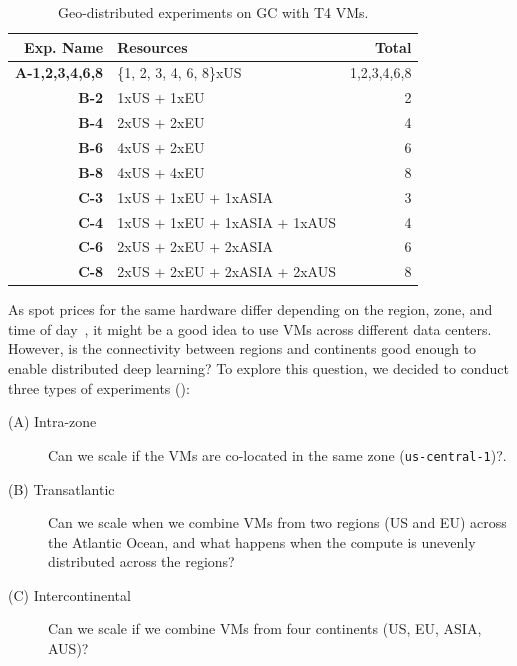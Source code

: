 \begin{table}[]
    \begin{tabular}{r|l|r}
    \textbf{Exp. Name} & \textbf{Resources} & \textbf{Total} \\ \hline
    \textbf{A-1,2,3,4,6,8} & \{1, 2, 3, 4, 6, 8\}xUS & 1,2,3,4,6,8\\ \hline
    \textbf{B-2} & 1xUS + 1xEU & 2\\
    \textbf{B-4} & 2xUS + 2xEU & 4\\
    \textbf{B-6} & 4xUS + 2xEU & 6\\
    \textbf{B-8} & 4xUS + 4xEU & 8 \\ \hline
    \textbf{C-3} & 1xUS + 1xEU + 1xASIA & 3\\
    \textbf{C-4} & 1xUS + 1xEU + 1xASIA + 1xAUS & 4\\
    \textbf{C-6} & 2xUS + 2xEU + 2xASIA & 6\\
    \textbf{C-8} & 2xUS + 2xEU + 2xASIA + 2xAUS & 8\\
    \end{tabular}
    \caption{Geo-distributed experiments on GC with T4 VMs.}
    \label{tab:geodistributed-experiments}
    \vspace*{-10mm}
\end{table} 

As spot prices for the same hardware differ depending on the region, zone, and time of day~\cite{lee2017deepspotcloud}, it might be a good idea to use VMs across different data centers.
However, is the connectivity between regions and continents good enough to enable distributed deep learning?
To explore this question, we decided to conduct three types of experiments ():
\begin{description}
    \item[(A) Intra-zone] Can we scale if the VMs are co-located in the same zone (\texttt{us-central-1})?.
    \item[(B) Transatlantic] Can we scale when we combine VMs from two regions (US and EU) across the Atlantic Ocean, and what happens when the compute is unevenly distributed across the regions?
    \item[(C) Intercontinental] Can we scale if we combine VMs from four continents (US, EU, ASIA, AUS)?
\end{description}


